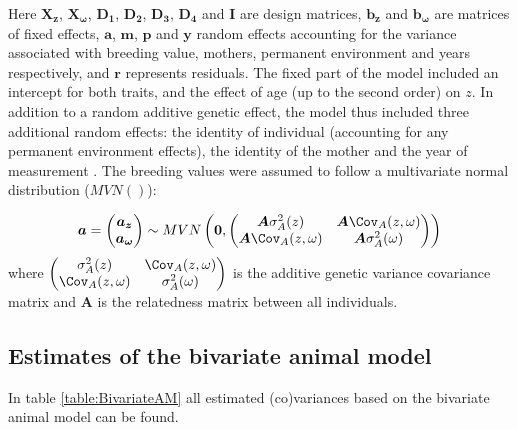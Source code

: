 \noindent Here $\boldsymbol{X_z}$, $\boldsymbol{X_{\omega}}$, $\boldsymbol{D_1}$, $\boldsymbol{D_2}$, $\boldsymbol{D_3}$, $\boldsymbol{D_4}$ and $\boldsymbol{I}$ are design matrices, $\boldsymbol{b_z}$ and $\boldsymbol{b_{\omega}}$ are matrices of fixed effects, $\boldsymbol{a}$, $\boldsymbol{m}$, $\boldsymbol{p}$ and $\boldsymbol{y}$ random effects accounting for the variance associated with breeding value, mothers, permanent environment and years respectively, and $\boldsymbol{r}$ represents residuals. The fixed part of the model included an intercept for both traits, and the effect of age (up to the second order) on $z$. In addition to a random additive genetic effect, the model thus included three additional random effects: the identity of individual (accounting for any permanent environment effects), the identity of the mother and the year of measurement \citep{Kruuk2004}. The breeding values were assumed to follow a multivariate normal distribution ($MVN()$):

\begin{equation}
\boldsymbol{a}=
\begin{pmatrix}
\boldsymbol{a_{z}}\\
\boldsymbol{a_{\omega}}
\end{pmatrix}
\sim MVN\left(\boldsymbol{0},
\begin{pmatrix}
\boldsymbol{A}\sigma_{A}^2(z) & \boldsymbol{A}\Cov_{A}(z,\omega)\\
\boldsymbol{A}\Cov_{A}(z,\omega)& \boldsymbol{A}\sigma_{A}^2(\omega)\\
\end{pmatrix}\right)
\end{equation}
where $\begin{pmatrix}
\sigma_{A}^2(z) & \Cov_{A}(z,\omega)\\
\Cov_{A}(z,\omega)& \sigma_{A}^2(\omega)\\
\end{pmatrix}$ is the additive genetic variance covariance matrix and $\boldsymbol{A}$ is the relatedness matrix between all individuals. 

\subsection{Estimates of the bivariate animal model}
In table \ref{table:BivariateAM} all estimated (co)variances based on the bivariate animal model can be found.

